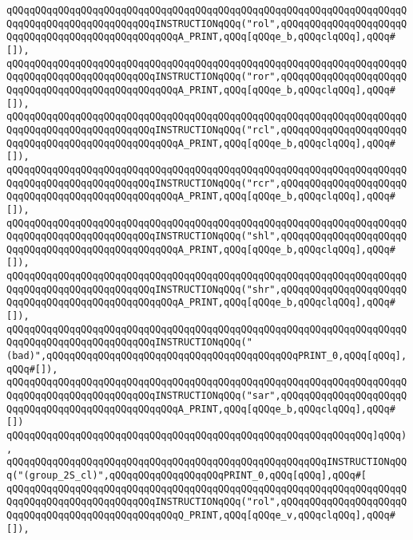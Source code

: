 \verb|qQQqqQQqqQQqqQQqqQQqqQQqqQQqqQQqqQQqqQQqqQQqqQQqqQQqqQQqqQQqqQQqqQQqqQQqqQQqqQQqqQQqqQQqqQQqqQQqINSTRUCTIONqQQq("rol",qQQqqQQqqQQqqQQqqQQqqQQqqQQqqQQqqQQqqQQqqQQqqQQqqQQqA_PRINT,qQQq[qQQqe_b,qQQqclqQQq],qQQq#[]),|\newline
\verb|qQQqqQQqqQQqqQQqqQQqqQQqqQQqqQQqqQQqqQQqqQQqqQQqqQQqqQQqqQQqqQQqqQQqqQQqqQQqqQQqqQQqqQQqqQQqqQQqINSTRUCTIONqQQq("ror",qQQqqQQqqQQqqQQqqQQqqQQqqQQqqQQqqQQqqQQqqQQqqQQqqQQqA_PRINT,qQQq[qQQqe_b,qQQqclqQQq],qQQq#[]),|\newline
\verb|qQQqqQQqqQQqqQQqqQQqqQQqqQQqqQQqqQQqqQQqqQQqqQQqqQQqqQQqqQQqqQQqqQQqqQQqqQQqqQQqqQQqqQQqqQQqqQQqINSTRUCTIONqQQq("rcl",qQQqqQQqqQQqqQQqqQQqqQQqqQQqqQQqqQQqqQQqqQQqqQQqqQQqA_PRINT,qQQq[qQQqe_b,qQQqclqQQq],qQQq#[]),|\newline
\verb|qQQqqQQqqQQqqQQqqQQqqQQqqQQqqQQqqQQqqQQqqQQqqQQqqQQqqQQqqQQqqQQqqQQqqQQqqQQqqQQqqQQqqQQqqQQqqQQqINSTRUCTIONqQQq("rcr",qQQqqQQqqQQqqQQqqQQqqQQqqQQqqQQqqQQqqQQqqQQqqQQqqQQqA_PRINT,qQQq[qQQqe_b,qQQqclqQQq],qQQq#[]),|\newline
\verb|qQQqqQQqqQQqqQQqqQQqqQQqqQQqqQQqqQQqqQQqqQQqqQQqqQQqqQQqqQQqqQQqqQQqqQQqqQQqqQQqqQQqqQQqqQQqqQQqINSTRUCTIONqQQq("shl",qQQqqQQqqQQqqQQqqQQqqQQqqQQqqQQqqQQqqQQqqQQqqQQqqQQqA_PRINT,qQQq[qQQqe_b,qQQqclqQQq],qQQq#[]),|\newline
\verb|qQQqqQQqqQQqqQQqqQQqqQQqqQQqqQQqqQQqqQQqqQQqqQQqqQQqqQQqqQQqqQQqqQQqqQQqqQQqqQQqqQQqqQQqqQQqqQQqINSTRUCTIONqQQq("shr",qQQqqQQqqQQqqQQqqQQqqQQqqQQqqQQqqQQqqQQqqQQqqQQqqQQqA_PRINT,qQQq[qQQqe_b,qQQqclqQQq],qQQq#[]),|\newline
\verb|qQQqqQQqqQQqqQQqqQQqqQQqqQQqqQQqqQQqqQQqqQQqqQQqqQQqqQQqqQQqqQQqqQQqqQQqqQQqqQQqqQQqqQQqqQQqqQQqINSTRUCTIONqQQq("(bad)",qQQqqQQqqQQqqQQqqQQqqQQqqQQqqQQqqQQqqQQqqQQqPRINT_0,qQQq[qQQq],qQQq#[]),|\newline
\verb|qQQqqQQqqQQqqQQqqQQqqQQqqQQqqQQqqQQqqQQqqQQqqQQqqQQqqQQqqQQqqQQqqQQqqQQqqQQqqQQqqQQqqQQqqQQqqQQqINSTRUCTIONqQQq("sar",qQQqqQQqqQQqqQQqqQQqqQQqqQQqqQQqqQQqqQQqqQQqqQQqqQQqA_PRINT,qQQq[qQQqe_b,qQQqclqQQq],qQQq#[])|\newline
\verb|qQQqqQQqqQQqqQQqqQQqqQQqqQQqqQQqqQQqqQQqqQQqqQQqqQQqqQQqqQQqqQQq]qQQq),|\newline
\verb|qQQqqQQqqQQqqQQqqQQqqQQqqQQqqQQqqQQqqQQqqQQqqQQqqQQqqQQqINSTRUCTIONqQQq("(group_2S_cl)",qQQqqQQqqQQqqQQqqQQqPRINT_0,qQQq[qQQq],qQQq#[|\newline
\verb|qQQqqQQqqQQqqQQqqQQqqQQqqQQqqQQqqQQqqQQqqQQqqQQqqQQqqQQqqQQqqQQqqQQqqQQqqQQqqQQqqQQqqQQqqQQqqQQqINSTRUCTIONqQQq("rol",qQQqqQQqqQQqqQQqqQQqqQQqqQQqqQQqqQQqqQQqqQQqqQQqqQQqQ_PRINT,qQQq[qQQqe_v,qQQqclqQQq],qQQq#[]),|\newline
